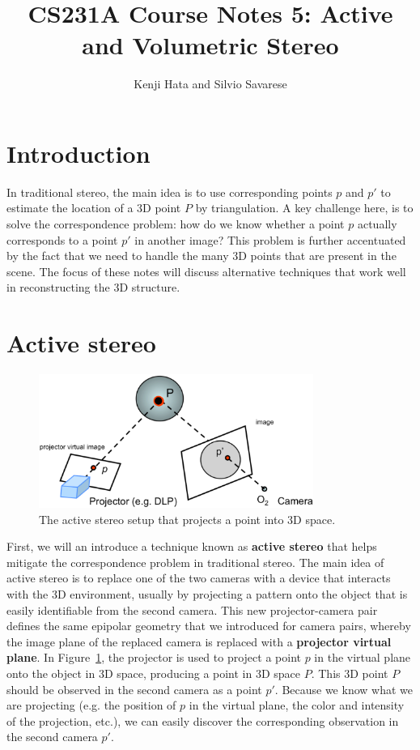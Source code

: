 \documentclass[a4paper, 12pt]{article}
\title{CS231A Course Notes 5: Active and Volumetric Stereo}
\author{Kenji Hata and Silvio Savarese}
\date{}
\renewcommand\emph{\textbf}
\numberwithin{equation}{section}
\begin{document}
\maketitle

\section{Introduction}
In traditional stereo, the main idea is to use corresponding points $p$ and $p'$ to estimate the location of a 3D point $P$ by triangulation. A key challenge here, is to solve the correspondence problem: how do we know whether a point $p$ actually corresponds to a point $p'$ in another image? This problem is further accentuated by the fact that we need to handle the many 3D points that are present in the scene. The focus of these notes will discuss alternative techniques that work well in reconstructing the 3D structure.

\section{Active stereo}
\begin{figure}[h!]
    \centering
    \includegraphics[width = 0.8\textwidth]{figures/active_stereo_setup.png}
    \caption{The active stereo setup that projects a point into 3D space.}
    \label{fig:active_stereo_setup}
\end{figure}

First, we will an introduce a technique known as \emph{active stereo} that helps mitigate the correspondence problem in traditional stereo. The main idea of active stereo is to replace one of the two cameras with a device that interacts with the 3D environment, usually by projecting a pattern onto the object that is easily identifiable from the second camera.  This new projector-camera pair defines the same epipolar geometry that we introduced for camera pairs, whereby the image plane of the replaced camera is replaced with a \emph{projector virtual plane}. In Figure~\ref{fig:active_stereo_setup}, the projector is used to project a point $p$ in the virtual plane onto the object in 3D space, producing a point in 3D space $P$. This 3D point $P$ should be observed in the second camera as a point $p'$. Because we know what we are projecting (e.g. the position of $p$ in the virtual plane, the color and intensity of the projection, etc.), we can easily discover the corresponding observation in the second camera $p'$. 
\end{document}
